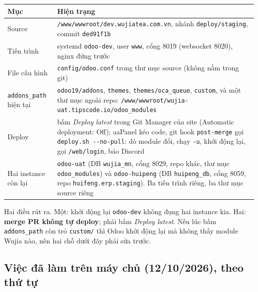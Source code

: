 \begin{center}
\small
\begin{tabularx}{\textwidth}{>{\raggedright\arraybackslash}p{3.3cm}>{\raggedright\arraybackslash}X}
\toprule
\textbf{Mục} & \textbf{Hiện trạng} \\
\midrule
Source & \texttt{/www/wwwroot/dev.wujiatea.com.vn}, nhánh \texttt{deploy/staging}, commit \texttt{ded91f1b} \\
Tiến trình & systemd \texttt{odoo-dev}, user \texttt{www}, cổng 8019 (websocket 8020), nginx đứng trước \\
File cấu hình & \texttt{config/odoo.conf} trong thư mục source (không nằm trong git) \\
\texttt{addons\_path} hiện tại & \texttt{odoo19/addons}, \texttt{themes}, \texttt{themes/oca\_queue}, \texttt{custom},
  và một thư mục ngoài repo: \texttt{/www/wwwroot/wujia-uat.tipscode.io/odoo\_modules} \\
Deploy & bấm \emph{Deploy latest} trong Git Manager của site (Automatic deployment: Off); aaPanel kéo code, git hook \texttt{post-merge} gọi \texttt{deploy.sh -{}-no-pull}: dò module đổi, chạy
  \texttt{-u}, khởi động lại, gọi \texttt{/web/login}, báo Discord \\
Hai instance còn lại & \texttt{odoo-uat} (DB \texttt{wujia\_mn}, cổng 8029, repo khác, thư mục
  \texttt{odoo\_modules}) và \texttt{odoo-huipeng} (DB \texttt{huipeng\_db}, cổng 8059, repo
  \texttt{huifeng.erp.staging}). Ba tiến trình riêng, ba thư mục source riêng \\
\bottomrule
\end{tabularx}
\end{center}

Hai điều rút ra. Một: khởi động lại \texttt{odoo-dev} không đụng hai instance kia. Hai: \textbf{merge PR không tự deploy}; phải bấm \emph{Deploy latest}. Nếu lúc bấm \texttt{addons\_path} còn trỏ
\texttt{custom/} thì Odoo khởi động lại mà không thấy module Wujia nào, nên hai chỗ dưới đây phải sửa trước.

\subsection{Việc đã làm trên máy chủ (12/10/2026), theo thứ tự}

